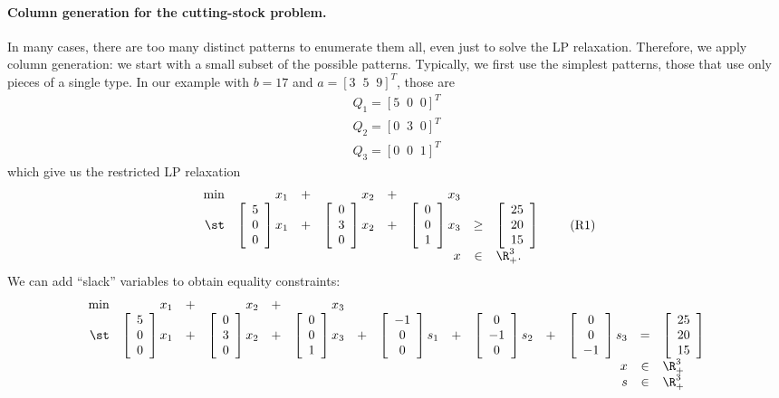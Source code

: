 \paragraph{Column generation for the cutting-stock problem. }
In many cases, there are too many distinct patterns to enumerate them
all, even just to solve the LP relaxation.
Therefore, we apply column generation: we start with a small
subset of the possible patterns. Typically, we first use the simplest
patterns, those that use only pieces of a single type. In our example
with $b = 17$ and $a = [ 3 \;\; 5 \;\; 9 ]^T$,
those are
\[
\begin{array}{l}
Q_1 = [ 5 \;\; 0 \;\; 0 ]^T \\
Q_2 = [ 0 \;\; 3 \;\; 0 ]^T \\
Q_3 = [ 0 \;\; 0 \;\; 1 ]^T
\end{array}
\]
which give us the restricted LP relaxation
\[
\begin{array}{rrcrcrcl}
\min & x_1 & + & x_2 & + & x_3 & & \\
\st &
	\vvec{5 \\ 0 \\ 0} x_1 & + &
	\vvec{0 \\ 3 \\ 0} x_2 & + &
	\vvec{0 \\ 0 \\ 1} x_3 & \geq &
	\vvec{25 \\ 20 \\ 15} \\
 & & & & & x & \in & \R^3_+.
\end{array}
\tag{R1}
\]
We can add ``slack'' variables to obtain equality constraints:
\[
\begin{array}{rrcrcrcrcrcrcl}
\min & x_1 & + & x_2 & + & x_3 & & \\
\st &
	\vvec{5 \\ 0 \\ 0} x_1 & + &
	\vvec{0 \\ 3 \\ 0} x_2 & + &
	\vvec{0 \\ 0 \\ 1} x_3 & + &
	\vvec{-1 \\ 0 \\ 0} s_1 & + &
	\vvec{0 \\ -1 \\ 0} s_2 & + &
	\vvec{0 \\ 0 \\ -1} s_3 & = &
	\vvec{25 \\ 20 \\ 15} \\
 & & & & & & & & & & & x & \in & \R^3_+ \\
 & & & & & & & & & & & s & \in & \R^3_+
\end{array}
\]
